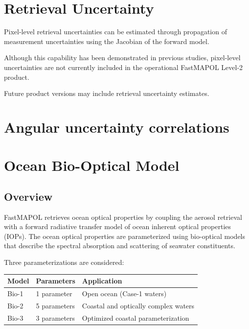 \documentclass[
  letterpaper,
]{scrbook}
\begin{document}
\chapter{Retrieval Uncertainty}\label{retrieval-uncertainty}

Pixel-level retrieval uncertainties can be estimated through propagation
of measurement uncertainties using the Jacobian of the forward model.

Although this capability has been demonstrated in previous studies,
pixel-level uncertainties are not currently included in the operational
FastMAPOL Level-2 product.

Future product versions may include retrieval uncertainty estimates.

\chapter{Angular uncertainty
correlations}\label{angular-uncertainty-correlations}

\chapter{Ocean Bio-Optical Model}\label{ocean-bio-optical-model}

\section{Overview}\label{overview-5}

FastMAPOL retrieves ocean optical properties by coupling the aerosol
retrieval with a forward radiative transfer model of ocean inherent
optical properties (IOPs). The ocean optical properties are
parameterized using bio-optical models that describe the spectral
absorption and scattering of seawater constituents.

Three parameterizations are considered:

\begin{longtable}[]{@{}lll@{}}
\toprule\noalign{}
Model & Parameters & Application \\
\midrule\noalign{}
\endhead
\bottomrule\noalign{}
\endlastfoot
Bio-1 & 1 parameter & Open ocean (Case-1 waters) \\
Bio-2 & 5 parameters & Coastal and optically complex waters \\
Bio-3 & 3 parameters & Optimized coastal parameterization \\
\end{longtable}
\end{document}
